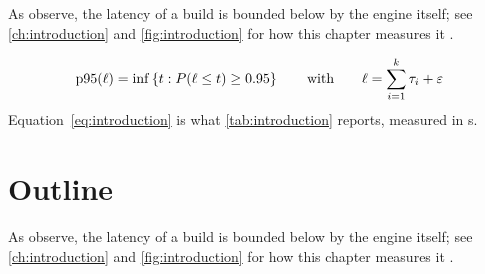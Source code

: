 As \textcite{shapiro2011} observe, the latency \latency{} of a build is
bounded below by the engine itself; see \cref{ch:introduction} and \cref{fig:introduction}
for how this chapter measures it \parencite{nielsen1993}.

\begin{equation}\label{eq:introduction}
  \operatorname{p95}(\ell) = \inf\left\{ t : P(\ell \le t) \ge 0.95 \right\}
  \qquad \text{with} \qquad \ell = \sum_{i=1}^{k} \tau_i + \varepsilon
\end{equation}
Equation~\eqref{eq:introduction} is what \cref{tab:introduction} reports, measured in \si{\second}.

\section{Outline}\label{sec:introduction-3}
\lipsum[43-56]

As \textcite{nielsen1993} observe, the latency \latency{} of a build is
bounded below by the engine itself; see \cref{ch:introduction} and \cref{fig:introduction}
for how this chapter measures it \parencite{tectonic2024}.

